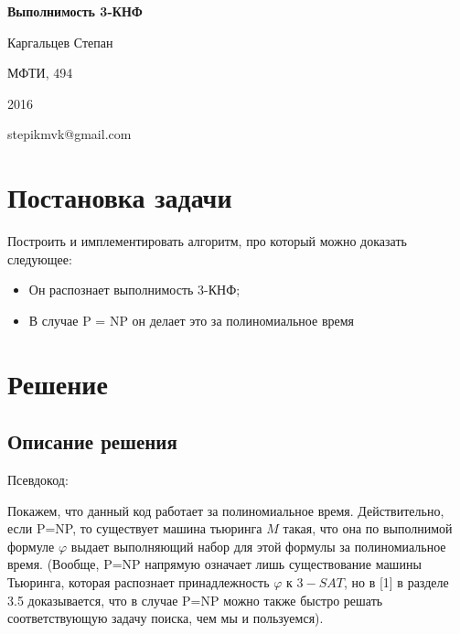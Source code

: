 \documentclass[paper=a4, fontsize=11pt]{scrartcl}
\begin{document}
\begin{center}
\textbf{Выполнимость 3-КНФ}
\end{center}

\begin{flushright}
Каргальцев Степан

МФТИ, 494

2016

stepikmvk@gmail.com
\end{flushright}

\tableofcontents

\section{Постановка задачи}
Построить и имплементировать алгоритм, про который можно доказать следующее:
\begin{itemize}
\item Он распознает выполнимость 3-КНФ;
\item В случае P = NP он делает это за полиномиальное время
\end{itemize}

\section{Решение}


\subsection{Описание решения}
\bigskip

Псевдокод:\\


\begin{algorithm}[H]
		\SetAlgoLined
\end{algorithm}


Покажем, что данный код работает за полиномиальное время. Действительно,
если P=NP, то существует машина тьюринга $M$ такая, что она по выполнимой
формуле $\varphi$ выдает выполняющий набор для этой формулы за полиномиальное
время. (Вообще, P=NP напрямую означает лишь существование машины Тьюринга,
которая распознает принадлежность $\varphi$ к $3-SAT$, но в [1] в разделе 3.5
доказывается, что
в случае P=NP можно также быстро решать соответствующую задачу поиска, чем мы и
пользуемся).\\
\end{document}
